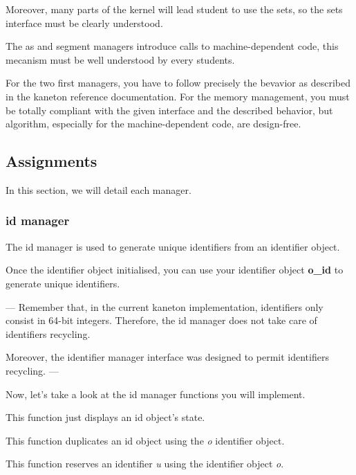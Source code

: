Moreover, many parts of the kernel will lead student to use the sets,
so the sets interface must be clearly understood.

The as and segment managers introduce calls to machine-dependent code, this
mecanism must be well understood by every students.

For the two first managers, you have to follow precisely the bevavior
as described in the kaneton reference documentation. For the memory
management, you must be totally compliant with the given interface and
the described behavior, but algorithm, especially for the machine-dependent
code, are design-free.

%
%

\subsection{Assignments}

In this section, we will detail each manager.

%
%

\subsubsection{id manager}

The id manager is used to generate unique identifiers from an identifier
object.

Once the identifier object initialised, you can use your
identifier object \textbf{o\_id} to generate unique identifiers.

---
Remember that, in the current kaneton implementation, identifiers only
consist in 64-bit integers. Therefore, the id manager does not take care
of identifiers recycling.

Moreover, the identifier manager interface was designed to permit
identifiers recycling.
---

Now, let's take a look at the id manager functions you will implement.

	  {This function just displays an id object's state.}

	  {This function duplicates an id object using the \textit{o}
	    identifier object.}

	  {This function reserves an identifier \textit{u} using the
	    identifier object \textit{o}.}

